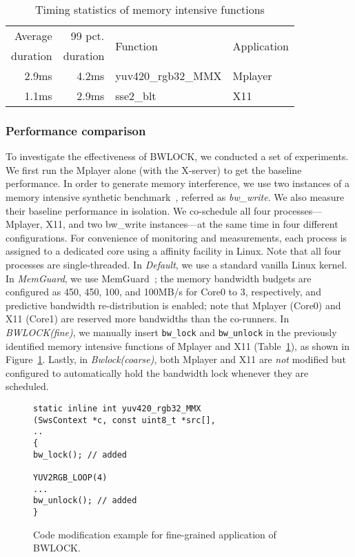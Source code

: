 \documentclass[times, 10pt,onecolumn]{article}
\newcommand{\bottomrule}{\hline}
\newcommand{\toprule}{\hline}
\newcommand{\midrule}{\hline}
\begin{document}
\begin{table}[htbp]
\centering
\begin{tabular}{rrll}
\toprule
Average & 99 pct. & \multirow{2}[0]{*}{Function} & \multirow{2}[0]{*}{Application} \\
duration & duration & & \\
\midrule
2.9ms & 4.2ms & yuv420\_rgb32\_MMX & Mplayer \\
1.1ms & 2.9ms & sse2\_blt & X11 \\
\bottomrule
\end{tabular}\caption{Timing statistics of memory intensive functions}
\label{tbl:functions-time}\end{table}





\subsubsection{Performance comparison}
To investigate the effectiveness of BWLOCK, we conducted a set of
experiments. We first run the Mplayer alone (with the
X-server) to get the baseline performance. In order to generate memory
interference, we use two instances of a memory intensive synthetic
benchmark~\cite{yun2013rtas}, referred as \emph{bw\_write}. We also
measure their baseline performance in isolation. We co-schedule all
four processes---Mplayer, X11, and two bw\_write instances---at the
same time in four different configurations.
For convenience of monitoring and measurements, each process is
assigned to a dedicated core using a affinity facility in
Linux. Note that all four processes are single-threaded.
In \emph{Default}, we use a standard vanilla Linux kernel. In
\emph{MemGuard}, we use MemGuard~\cite{yun2013rtas}; the memory bandwidth
budgets are configured as 450, 450, 100, and 100MB/s for Core0 to 3,
respectively, and predictive bandwidth re-distribution is enabled;
note that Mplayer (Core0) and X11 (Core1) are reserved more bandwidths
than the co-runners. In \emph{BWLOCK(fine)}, we manually insert
\texttt{bw\_lock} and \texttt{bw\_unlock} in the previously identified
memory intensive functions of Mplayer and X11 (Table~\ref{tbl:functions-time}), as shown in
Figure~\ref{fig:bwlock-example}. Lastly, in \emph{Bwlock(coarse)},
both Mplayer and X11 are \emph{not} modified but configured to automatically
hold the bandwidth lock whenever they are scheduled.

\begin{figure}
\begin{lstlisting}
static inline int yuv420_rgb32_MMX
(SwsContext *c, const uint8_t *src[],
..
{
bw_lock(); // added

YUV2RGB_LOOP(4)
...
bw_unlock(); // added
}
\end{lstlisting}
\caption{Code modification example for fine-grained application of BWLOCK. }
\label{fig:bwlock-example}
\end{figure}
\end{document}
